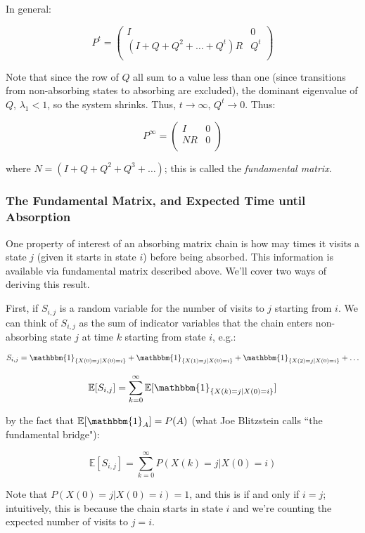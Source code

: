 \documentclass[11pt]{article}
\newcommand{\E}{\mathbb{E}}
\begin{document}
In general:

$$
P^t = \begin{pmatrix}
  I & 0 \\
  (I + Q + Q^2 + \ldots + Q^t)R & Q^t \\
\end{pmatrix}
$$

Note that since the row of $Q$ all sum to a value less than one (since
transitions from non-absorbing states to absorbing are excluded), the dominant
eigenvalue of $Q$, $\lambda_1 < 1$, so the system shrinks. Thus, $t \rightarrow
\infty$, $Q^t \rightarrow 0$. Thus:


$$
P^\infty = \begin{pmatrix}
  I & 0 \\
  NR & 0 \\
\end{pmatrix}
$$

where $N = (I + Q + Q^2 + Q^3 + \ldots)$; this is called the \emph{fundamental
matrix}.


\subsubsection{The Fundamental Matrix, and Expected Time until Absorption}

One property of interest of an absorbing matrix chain is how may times it
visits a state $j$ (given it starts in state $i$) before being absorbed. This
information is available via fundamental matrix described above. We'll cover
two ways of deriving this result.

First, if $S_{i,j}$ is a random variable for the number of visits to $j$
starting from $i$. We can think of $S_{i,j}$ as the sum of indicator variables
that the chain enters non-absorbing state $j$ at time $k$ starting from state
$i$, e.g.:

$$
S_{i,j} = \mathbbm{1}_{\{X(0) = j | X(0) = i\}} + \mathbbm{1}_{\{X(1) = j | X(0) = i\}} + \mathbbm{1}_{\{X(2) = j | X(0) = i\}} + \ldots
$$

$$
\E[S_{i,j}] = \sum_{k=0}^\infty \E[\mathbbm{1}_{\{X(k) = j | X(0) = i\}}]
$$

by the fact that $\E[\mathbbm{1}_A] = P(A)$ (what Joe Blitzstein calls ``the
fundamental bridge"):

$$
\E[S_{i,j}] = \sum_{k=0}^\infty P(X(k) = j | X(0) = i)
$$

Note that $P(X(0) = j | X(0) = i) = 1$, and this is if and only if $i = j$;
intuitively, this is because the chain starts in state $i$ and we're counting
the expected number of visits to $j=i$.
\end{document}
